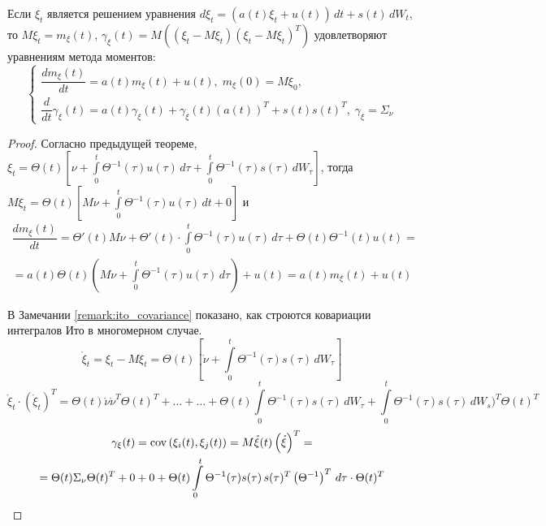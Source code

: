 \begin{theorem}
  Если $\xi_t$ является решением уравнения
  $d\xi_t = \left(a(t)\xi_t + u(t)\right) \, dt + s(t) \, dW_t$, то
  $M\xi_t = m_\xi(t)$, $\gamma_\xi(t) = M\left( ( \xi_t - M\xi_t )( \xi_t - M\xi_t )^T \right)$
  удовлетворяют уравнениям метода моментов:
  \[
    \begin{cases}
      \dfrac{dm_\xi(t)}{dt} = a(t) m_\xi(t) + u(t), \; m_\xi(0) = M\xi_0, \\
      \dfrac{d}{dt}\gamma_\xi(t) = a(t) \gamma_\xi(t) + \gamma_\xi(t) (a(t))^T + s(t) s(t)^T, \;
      \gamma_\xi = \Sigma_\nu
    \end{cases}
  \]
\end{theorem}
\begin{proof}
  Согласно предыдущей теореме,
  $\xi_t = \Theta(t) \left[ \nu + \int\limits_0^t \Theta^{-1}(\tau) u(\tau) \, d\tau + \int\limits_0^t \Theta^{-1}(\tau) s(\tau) \, dW_\tau \right] $,
  тогда $M\xi_t = \Theta(t) \left[ M\nu + \int\limits_0^t \Theta^{-1}(\tau) u(\tau) \, dt + 0 \right] $
  и
  \begin{multline*}
    \dfrac{dm_\xi(t)}{dt} =
    \Theta'(t) M\nu + \Theta'(t) \cdot \int\limits_0^t \Theta^{-1}(\tau) u(\tau) \, d\tau + \Theta(t) \Theta^{-1}(t) u(t) = \\
    = a(t) \Theta(t) \left( M\nu + \int\limits_0^t \Theta^{-1}(\tau) u(\tau) \, d\tau \right) + u(t) =
    a(t) m_\xi(t) + u(t)
  \end{multline*}

  В Замечании \ref{remark:ito_covariance} показано, как строются ковариации интегралов Ито
  в многомерном случае.
  \[
    \mathring{\xi}_t = \xi_t - M\xi_t = \Theta(t) \left[ \mathring{\nu} + \int\limits_0^t \Theta^{-1}(\tau) s(\tau) \, dW_\tau \right] 
  \]
  \[
    \mathring{\xi}_t \cdot \left(\mathring{\xi}_t\right)^T = \Theta(t) \mathring{\nu} \mathring{\nu}^T \Theta(t)^T + \dots + \dots + \Theta(t) \int\limits_0^t \Theta^{-1}(\tau) s(\tau) \, dW_\tau + \int\limits_0^t \Theta^{-1}(\tau) s(\tau) \, dW_s)^T \Theta(t)^T
  \]
  \begin{multline*}
    \gamma_\xi(t) = \operatorname{cov} \left( \xi_i(t), \xi_j(t) \right) = M \mathring{\xi}(t) \left( \mathring{\xi} \right)^T = \\
    = \Theta(t) \Sigma_\nu \Theta(t)^T + 0 + 0 + \Theta(t) \int\limits_0^t \Theta^{-1}(\tau) s(\tau) \, s(\tau)^T \left(\Theta^{-1}\right)^T \, d\tau \cdot \Theta(t)^T
  \end{multline*}


\end{proof}
